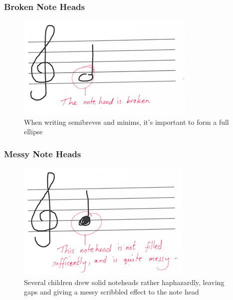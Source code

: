 \subsubsection{Broken Note Heads}\label{sec:tf-note-head-broken}

\begin{figure}[hbt]
  \centering
  \includegraphics[width=\linewidth]{gfx/teacher-notes/mistake-notehead-broken.png}
  \caption{When writing semibreves and minims, it's important to form a full ellipse}
\end{figure}

\subsubsection{Messy Note Heads}\label{sec:tf-note-head-messy}

\begin{figure}[hbt]
  \centering
  \includegraphics[width=\linewidth]{gfx/teacher-notes/mistake-notehead-messy.png}
  \caption{Several children drew solid noteheads rather haphazardly, leaving gaps and giving a messy scribbled effect to the note head}
\end{figure}

